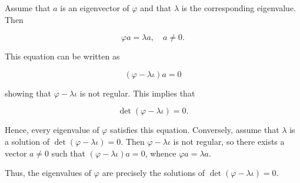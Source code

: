 Assume that $a$ is an eigenvector of $\varphi$ and that $\lambda$ is the corresponding eigenvalue. Then

$$\varphi a = \lambda a, \quad a \neq 0.$$

This equation can be written as

$$(\varphi - \lambda \iota) a = 0$$

showing that $\varphi - \lambda \iota$ is not regular. This implies that

$$\det (\varphi - \lambda \iota) = 0.$$

Hence, every eigenvalue of $\varphi$ satisfies this equation. Conversely, assume that $\lambda$ is a solution of $\det (\varphi - \lambda \iota) = 0$. Then $\varphi - \lambda \iota$ is not regular, so there exists a vector $a \neq 0$ such that $(\varphi - \lambda \iota) a = 0$, whence $\varphi a = \lambda a$.

Thus, the eigenvalues of $\varphi$ are precisely the solutions of $\det(\varphi - \lambda \iota) = 0$.
